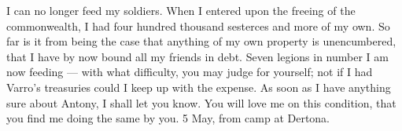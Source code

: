  I can no longer feed my soldiers. When I entered upon the freeing of the commonwealth, I had four hundred thousand sesterces and more of my own. So far is it from being the case that anything of my own property is unencumbered, that I have by now bound all my friends in debt. Seven legions in number I am now feeding --- with what difficulty, you may judge for yourself; not if I had Varro's treasuries could I keep up with the expense. As soon as I have anything sure about Antony, I shall let you know. You will love me on this condition, that you find me doing the same by you. 5 May, from camp at Dertona.
